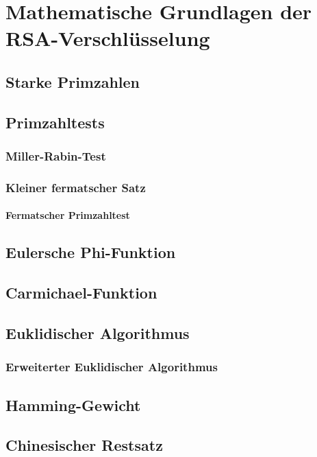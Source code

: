 \chapter{Mathematische Grundlagen der RSA-Verschlüsselung}

\section{Starke Primzahlen}
\newpage
\section{Primzahltests}
\subsection{Miller-Rabin-Test}
\newpage
\subsection{Kleiner fermatscher Satz}
\subsubsection{Fermatscher Primzahltest}
\newpage
\section{Eulersche Phi-Funktion}
\newpage
\section{Carmichael-Funktion}
\newpage
\section{Euklidischer Algorithmus}
\newpage
\subsection{Erweiterter Euklidischer Algorithmus}
\newpage
\section{Hamming-Gewicht}
\newpage
\section{Chinesischer Restsatz}
